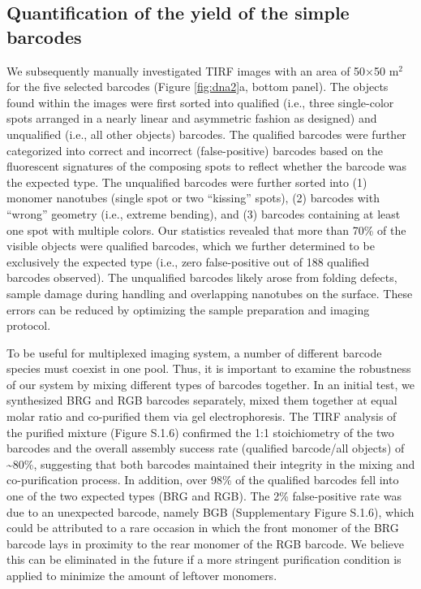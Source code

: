 \subsection{Quantification of the yield of the simple barcodes}
We subsequently %
manually investigated TIRF images with an area of 50×50 \textmu m$^2$ for the five selected 
barcodes (Figure \ref{fig:dna2}a, bottom panel). The objects found within the images were first sorted 
into qualified (i.e., three single-color spots arranged in a nearly linear and asymmetric 
fashion as designed) and unqualified (i.e., all other objects) barcodes. The qualified 
barcodes were further categorized into correct and incorrect (false-positive) barcodes 
based on the fluorescent signatures of the composing spots to reflect whether the barcode 
was the expected type. The unqualified barcodes were further sorted into (1) monomer 
nanotubes (single spot or two “kissing” spots), (2) barcodes with “wrong” geometry (i.e., 
extreme bending), and (3) barcodes containing at least one spot with multiple colors. Our 
statistics revealed that more than 70\% of the visible objects were qualified barcodes, 
which we further determined to be exclusively the expected type (i.e., zero false-positive 
out of 188 qualified barcodes observed). The unqualified barcodes likely arose from 
folding defects, sample damage during handling and overlapping nanotubes on the 
surface. These errors can be reduced by optimizing the sample preparation and imaging 
protocol. 

To be useful for multiplexed imaging system, a number of different barcode species must
coexist in one pool. Thus, it is important to examine the robustness of our system by 
mixing different types of barcodes together. In an initial test, we synthesized BRG and 
RGB barcodes separately, mixed them together at equal molar ratio and co-purified them 
via gel electrophoresis. The TIRF analysis of the purified mixture (Figure S.1.6) confirmed 
the 1:1 stoichiometry of the two barcodes and the overall assembly success rate (qualified 
barcode/all objects) of \textasciitilde80\%, suggesting that both barcodes maintained their integrity in 
the mixing and co-purification process. In addition, over 98\% of the qualified barcodes 
fell into one of the two expected types (BRG and RGB). The 2\% false-positive rate was 
due to an unexpected barcode, namely BGB (Supplementary Figure  S.1.6), which could be attributed to a 
rare occasion in which the front monomer of the BRG barcode lays in proximity to the 
rear monomer of the RGB barcode. We believe this can be eliminated in the future if a 
more stringent purification condition is applied to minimize the amount of leftover 
monomers.  


